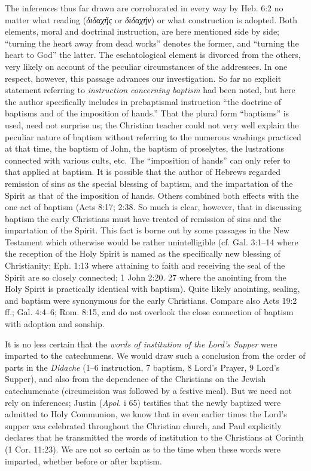 The inferences thus far drawn are corroborated in every way by Heb. 6:2 no matter what reading (\emph{διδαχῆς} or \emph{διδαχήν}) or what construction is adopted. Both elements, moral and doctrinal instruction, are here mentioned side by side; “turning the heart away from dead works” denotes the former, and “turning the heart to God” the latter. The eschatological element is divorced from the others, very likely on account of the peculiar circumstances of the addressees. In one respect, however, this passage advances our investigation. So far no explicit statement referring to \emph{instruction concerning baptism} had been noted, but here the author specifically includes in prebaptismal instruction “the doctrine of baptisms and of the imposition of hands.” That the plural form “baptisms” is used, need not surprise us; the Christian teacher could not very well explain the peculiar nature of baptism without referring to the numerous washings practiced at that time, the baptism of John, the baptism of proselytes, the lustrations connected with various cults, etc. The “imposition of hands” can only refer to that applied at baptism. It is possible
that the author of Hebrews regarded remission of sins as the special blessing of baptism, and the impartation of the Spirit as that of the imposition of hands. Others combined both effects with the one act of baptism (Acts 8:17; 2:38. So much is clear, however, that in discussing baptism the early Christians must have treated of remission of sins and the impartation of the Spirit. This fact is borne out by some passages in the New Testament which otherwise would be rather unintelligible (cf. Gal. 3:1–14 where the reception of the Holy Spirit is named as the specifically new blessing of Christianity; Eph. 1:13 where attaining to faith and receiving the seal of the Spirit are so closely connected; 1 John 2:20. 27 where the anointing from the Holy Spirit is practically identical with baptism). Quite likely anointing, sealing, and baptism were synonymous for the early Christians. Compare also Acts 19:2 ff.; Gal. 4:4–6; Rom. 8:15, and do not overlook the close connection of baptism with adoption and sonship.

It is no less certain that the \emph{words of institution of the Lord’s Supper} were imparted to the catechumens. We would draw such a conclusion from the order of parts in the \emph{Didache} (1–6 instruction, 7 baptism, 8 Lord’s Prayer, 9 Lord’s Supper), and also from the dependence of the Christians on the Jewish catechumenate (circumcision was followed by a festive meal). But we need not rely on inferences; Justin (\emph{Apol.} i 65) testifies that the newly baptized were admitted to Holy Communion, we know that in even earlier times the Lord’s supper was celebrated throughout the Christian church, and Paul explicitly declares that he transmitted the words of institution to the Christians at Corinth (1 Cor. 11:23). We are not so certain as to the time when these words were imparted, whether before or after baptism.

